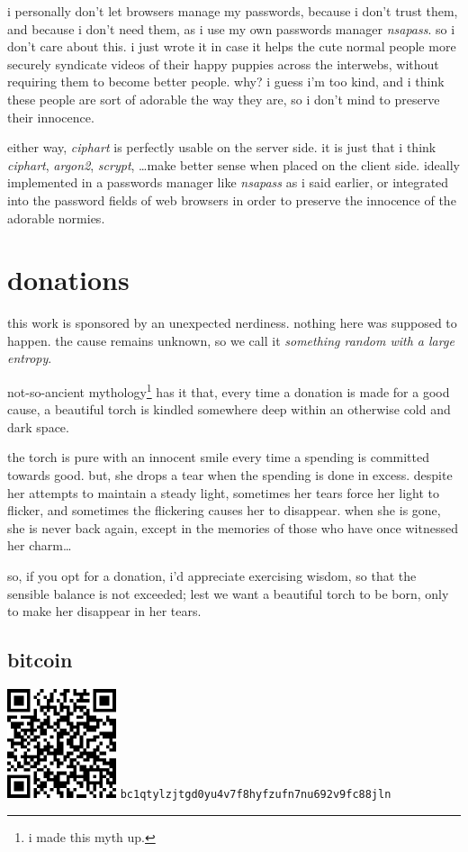 \documentclass[twocolumn]{article}
\begin{document}
i personally don't let browsers manage my passwords, because i don't trust
them, and because i don't need them, as i use my own passwords manager
\emph{nsapass}.  so i don't care about this.  i just wrote it in case it
helps the cute normal people more securely syndicate videos of their happy
puppies across the interwebs, without requiring them to become better
people.  why?  i guess i'm too kind, and i think these people are sort of
adorable the way they are, so i don't mind to preserve their innocence.

either  way, \emph{ciphart} is perfectly usable on the server side.  it is
just that i think \emph{ciphart}, \emph{argon2}, \emph{scrypt}, \ldots make
better sense when placed on the client side.  ideally implemented in a
passwords manager like \emph{nsapass} as i said earlier, or integrated into
the password fields of web browsers in order to preserve the innocence of
the adorable normies.

\vfill
\break
\appendix
\section{donations}
this work is sponsored by an unexpected nerdiness.  nothing here was
supposed to happen.  the cause  remains unknown, so we call it
\emph{something random with a large entropy}.

not-so-ancient mythology\footnote{i made this myth up.} has it that, every
time a donation is made for a good cause, a beautiful torch is kindled
somewhere deep within an otherwise cold and dark space.

the torch is pure with an innocent smile every time a spending is committed
towards good.  but, she drops a tear when the spending is done in excess.
despite her attempts to maintain a steady light, sometimes her tears force
her light to flicker, and sometimes the flickering causes her to disappear.
when she is gone, she is never back again, except in the memories of those
who have once witnessed her charm\ldots

so, if you opt for a donation, i'd appreciate exercising wisdom, so that
the sensible balance is not exceeded; lest we want a beautiful torch to be
born, only to make her disappear in her tears.

\subsection{bitcoin}
\begin{center}
    \includegraphics[width=121px]{./pics/btc_wallet_address_trimmed.png}
    \texttt{bc1qtylzjtgd0yu4v7f8hyfzufn7nu692v9fc88jln}
\end{center}
\end{document}
